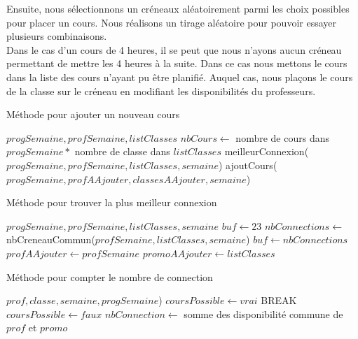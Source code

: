 Ensuite, nous sélectionnons un créneaux aléatoirement parmi les choix possibles pour placer un cours. Nous réalisons un tirage aléatoire pour pouvoir essayer plusieurs combinaisons.\\

Dans le cas d'un cours de 4 heures, il se peut que nous n'ayons aucun créneau permettant de mettre les 4 heures à la suite. Dans ce cas nous mettons le cours dans la liste des cours n'ayant pu être planifié. 
Auquel cas, nous plaçons le cours de la classe sur le créneau en modifiant les disponibilités du professeurs. 

\begin{algorithm}
\caption {Méthode pour ajouter un nouveau cours}
\begin{algorithmic}
\REQUIRE $progSemaine, profSemaine, listClasses$
\STATE $nbCours \leftarrow $ nombre de cours dans $progSemaine * $ nombre de classe dans $listClasses$
\STATE meilleurConnexion($progSemaine, profSemaine, listClasses, semaine$)
\STATE ajoutCours($progSemaine, profAAjouter, classesAAjouter, semaine$)
\ELSE
{}
\ENDIF
\ENDFOR
{}
\end{algorithmic}
\end{algorithm}

\newpage

\begin{algorithm}
\caption {Méthode pour trouver la plus meilleur connexion}
\begin{algorithmic}
\REQUIRE $progSemaine, profSemaine, listClasses, semaine$
\STATE $buf \leftarrow 23$
\STATE $nbConnections \leftarrow $ nbCreneauCommun($profSemaine, listClasses, semaine$)
\STATE $buf \leftarrow nbConnections$
\STATE $profAAjouter \leftarrow profSemaine$
\STATE $promoAAjouter \leftarrow listClasses$
\ENDIF
\ENDFOR
\ENDFOR
\end{algorithmic}
\end{algorithm}

\begin{algorithm}
\caption {Méthode pour compter le nombre de connection}
\begin{algorithmic}
\REQUIRE $prof, classe, semaine, progSemaine$)
\STATE $coursPossible \leftarrow vrai$
\STATE BREAK
\ELSE
\STATE $coursPossible \leftarrow faux$
\ENDIF
\ENDFOR
{}
\RETURN $nbConnection \leftarrow $ somme des disponibilité commune de $prof$ et $promo$
\ENDIF
{}
\end{algorithmic}
\end{algorithm}

